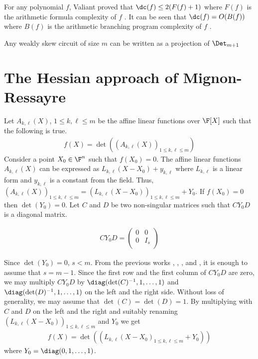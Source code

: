 For any polynomial $f$, Valiant proved that $\dc(f) \leq 2(F(f)+ 1)$ where $F(f)$ is the arithmetic formula complexity of $f$ \cite{v79}. It can be seen that $\dc(f) = O(B(f))$ where $B(f)$ is the arithmetic branching program complexity of $f$ \cite{mp08}.

\begin{remark}[\cite{mp08}]
  Any weakly skew circuit of size $m$ can be written as a projection of $\Det_{m+1}$
\end{remark}


\section{The Hessian approach of Mignon-Ressayre}

 Let $A_{k,\ell}(X)$, $1\leq k,\ell\leq m$ be the affine linear functions over $\F[X]$ such that the following is true.
\begin{align*}
  f(X) = \det((A_{k,\ell}(X))_{1\leq k,\ell\leq m})
\end{align*}
 Consider a point $X_0\in \F^{n}$ such that $f(X_0)=0$. The affine linear functions $A_{k,\ell}(X)$ can be expressed as $L_{k,\ell}(X-X_0) + y_{k,\ell}$ where $L_{k,\ell}$ is a linear form and $y_{k,\ell}$ is a constant from the field. Thus, $(A_{k,\ell}(X))_{1\leq k,\ell\leq m} = (L_{k,\ell}(X-X_0))_{1\leq k,\ell\leq m} + Y_0$. If $f(X_0)=0$ then $\det(Y_0)=0$. Let $C$ and $D$ be two non-singular matrices such that $CY_0D$ is a diagonal matrix.

\begin{align*}
  CY_0D =
  \begin{pmatrix}
    0& 0\\
    0& I_s\\
  \end{pmatrix}
\end{align*}

Since $\det(Y_0)=0$, $s<m$. From the previous works \cite{von1987}, \cite{cai1990}, \cite{mr04}, and \cite{ccl2008}, it is enough to assume that $s=m-1$. Since the first row and the first column of $CY_0D$ are zero, we may multiply $CY_0D$ by $\diag(\det(C)^{-1},1,\dots,1)$ and $\diag(\det(D)^{-1},1,\dots,1)$ on the left and the right side. Without loss of generality, we may assume that $\det(C)=\det(D)=1$. By multiplying with $C$ and $D$ on the left and the right and suitably renaming $(L_{k,\ell}(X-X_0))_{1\leq k,\ell\leq m}$ and $Y_0$ we get
\begin{align*}
  f(X) = \det((L_{k,\ell}(X-X_0)_{1\leq k,\ell\leq m} + Y_0))
\end{align*}
where $Y_0 = \diag(0,1,\dots,1)$. 

